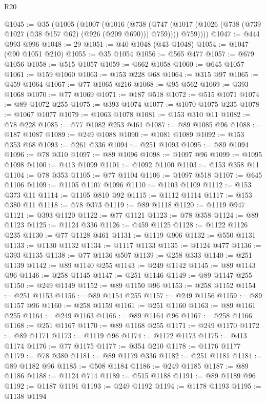 \begin{lexlean}{R20}
\begin{coremodule}
@1045 := @35
    (@1005
      (@1007
        (@1016
          (@738
            (@747 (@1017 (@1026 (@738 (@739 @1027 (@38 @157 @62) (@926 (@209 @690))) @759))))
            @759))))
@1047 := @444 @993 @996
@1048 := 29
@1051 := @40 @1048 (@43 @1048)
@1054 := @1047 (@90 @1051 @210)
@1055 := @35 @1054
@1056 := @565 @477
@1057 := @679 @1056
@1058 := @515 @1057
@1059 := @662 @1058
@1060 := @645 @1057
@1061 := @159 @1060
@1063 := @153 @228 @68
@1064 := @315 @97
@1065 := @459 @1064
@1067 := @77 @1065 @216
@1068 := @95 @562
@1069 := @393 @1068
@1070 := @77 @1069
@1071 := @187 @518
@1072 := @515 @1071
@1074 := @89 @1072 @255
@1075 := @393 @1074
@1077 := @1070 @1075 @235
@1078 := @1067 @1077
@1079 := @1063 @1078
@1081 := @153 @310 @11
@1082 := @78 @228
@1085 := @77 @1082 @253 @461
@1087 := @89 @1085 @96
@1088 := @187 @1087
@1089 := @249 @1088
@1090 := @1081 @1089
@1092 := @153 @353 @68
@1093 := @261 @336
@1094 := @251 @1093
@1095 := @89 @1094
@1096 := @78 @310
@1097 := @89 @1096
@1098 := @1097 @96
@1099 := @1095 @1098
@1100 := @413 @1099
@1101 := @1092 @1100
@1103 := @153 @358 @11
@1104 := @78 @353
@1105 := @77 @1104
@1106 := @1097 @518
@1107 := @645 @1106
@1109 := @1105 @1107 @1096
@1110 := @1103 @1109
@1112 := @153 @373 @11
@1114 := @1105 @810 @92
@1115 := @1112 @1114
@1117 := @153 @380 @11
@1118 := @78 @373
@1119 := @89 @1118
@1120 := @1119 @947
@1121 := @393 @1120
@1122 := @77 @1121
@1123 := @78 @358
@1124 := @89 @1123
@1125 := @1124 @336
@1126 := @459 @1125
@1128 := @1122 @1126 @235
@1130 := @77 @1128 @461
@1131 := @1119 @906
@1132 := @550 @1131
@1133 := @1130 @1132
@1134 := @1117 @1133
@1135 := @1124 @477
@1136 := @393 @1135
@1138 := @77 @1136 @507
@1139 := @258 @333
@1140 := @251 @1139
@1142 := @89 @1140 @255
@1143 := @249 @1142
@1145 := @89 @1143 @96
@1146 := @258 @1145
@1147 := @251 @1146
@1149 := @89 @1147 @255
@1150 := @249 @1149
@1152 := @89 @1150 @96
@1153 := @258 @1152
@1154 := @251 @1153
@1156 := @89 @1154 @255
@1157 := @249 @1156
@1159 := @89 @1157 @96
@1160 := @258 @1159
@1161 := @251 @1160
@1163 := @89 @1161 @255
@1164 := @249 @1163
@1166 := @89 @1164 @96
@1167 := @258 @1166
@1168 := @251 @1167
@1170 := @89 @1168 @255
@1171 := @249 @1170
@1172 := @89 @1171
@1173 := @1119 @96
@1174 := @1172 @1173
@1175 := @413 @1174
@1176 := @77 @1175
@1177 := @354 @210
@1178 := @1176 @1177
@1179 := @78 @380
@1181 := @89 @1179 @336
@1182 := @251 @1181
@1184 := @89 @1182 @96
@1185 := @508 @1184
@1186 := @249 @1185
@1187 := @89 @1186
@1188 := @1124 @714
@1189 := @515 @1188
@1191 := @89 @1189 @96
@1192 := @1187 @1191
@1193 := @249 @1192
@1194 := @1178 @1193
@1195 := @1138 @1194

\end{coremodule}
\end{lexlean}
